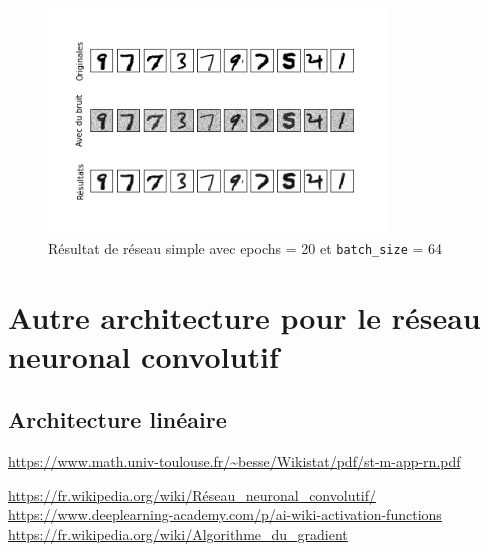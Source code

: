 \documentclass[12pt,a4paper]{article}
\begin{document}
\begin{figure}[h!]
  \centering
  \includegraphics[width=0.8\textwidth]{model_simple.png}
  \caption{Résultat de réseau simple avec epochs = 20 et \lstinline{batch_size} = 64}
  \label{fig:9}
\end{figure}

\section{Autre architecture pour le réseau neuronal convolutif}
\subsection{Architecture linéaire}

\pagebreak
\begin{thebibliography}{9}

   \url{https://www.math.univ-toulouse.fr/~besse/Wikistat/pdf/st-m-app-rn.pdf}

   \url{https://fr.wikipedia.org/wiki/Réseau_neuronal_convolutif/}
   \url{https://www.deeplearning-academy.com/p/ai-wiki-activation-functions}
   \url{https://fr.wikipedia.org/wiki/Algorithme_du_gradient}
\end{thebibliography}
\end{document}

